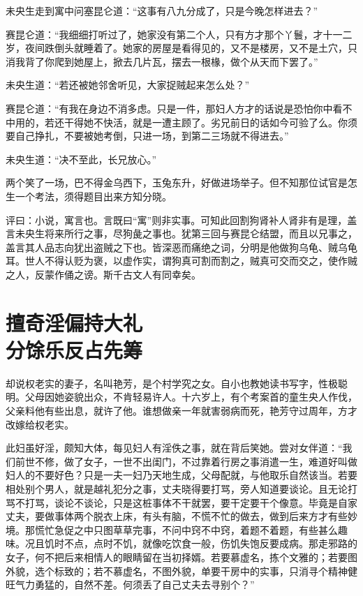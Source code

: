 \documentclass[a4paper,12pt,UTF8,twoside]{ctexbook}
\begin{document}
未央生走到寓中问塞昆仑道：“这事有八九分成了，只是今晚怎样进去？”

赛昆仑道：“我细细打听过了，她家没有第二个人，只有方才那个丫鬟，才十一二岁，夜间跌倒头就睡着了。她家的房屋是看得见的，又不是楼房，又不是土穴，只消我背了你爬到她屋上，掀去几片瓦，摆去一根椽，做个从天而下罢了。”

未央生道：“若还被她邻舍听见，大家捉贼起来怎么处？”

赛昆仑道：“有我在身边不消多虑。只是一件，那妇人方才的话说是恐怕你中看不中用的，若还干得她不快活，就是一遭主顾了。劣兄前日的话如今可验了么。你须要自己挣扎，不要被她考倒，只进一场，到第二三场就不得进去。”

未央生道：“决不至此，长兄放心。”

两个笑了一场，巴不得金乌西下，玉兔东升，好做进场举子。但不知那位试官是怎生一个考法，须得题目出来方知分晓。

评曰：小说，寓言也。言既曰“寓”则非实事。可知此回割狗肾补人肾非有是理，盖言未央生将来所行之事，尽狗彘之事也。犹第三回与赛昆仑结盟，而且以兄事之，盖言其人品志向犹出盗贼之下也。皆深恶而痛绝之词，分明是他做狗乌龟、贼乌龟耳。世人不得认贬为褒，以虚作实，谓狗真可割而割之，贼真可交而交之，使作贼之人，反蒙作俑之谤。斯千古文人有同幸矣。

\chapter[擅奇淫偏持大礼\ 分馀乐反占先筹]{擅奇淫偏持大礼\\分馀乐反占先筹}

却说权老实的妻子，名叫艳芳，是个村学究之女。自小也教她读书写字，性极聪明。父母因她姿貌出众，不肯轻易许人。十六岁上，有个考案首的童生央人作伐，父亲料他有些出息，就许了他。谁想做亲一年就害弱病而死，艳芳守过周年，方才改嫁给权老实。

此妇虽好淫，颇知大体，每见妇人有淫佚之事，就在背后笑她。尝对女伴道：“我们前世不修，做了女子，一世不出闺门，不过靠着行房之事消遣一生，难道好叫做妇人的不要好色？只是一夫一妇乃天地生成，父母配就，与他取乐自然该当。若要相处别个男人，就是越礼犯分之事，丈夫晓得要打骂，旁人知道要谈论。且无论打骂不打骂，谈论不谈论，只是这桩事体不干就罢，要干定要干个像意。毕竟是自家丈夫，要做事体两个脱衣上床，有头有脑，不慌不忙的做去，做到后来方才有些妙境。那慌忙急促之中只图草草完事，不问中窍不中窍，着题不着题，有些甚么趣味。况且饥时不点，点时不饥，就像吃饮食一般，伤饥失饱反要成病。那走邪路的女子，何不把后来相情人的眼睛留在当初择婿。若要慕虚名，拣个文雅的；若要图外貌，选个标致的；若不慕虚名，不图外貌，单要干房中的实事，只消寻个精神健旺气力勇猛的，自然不差。何须丢了自己丈夫去寻别个？”
\end{document}
